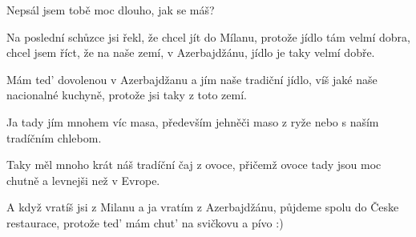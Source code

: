 \documentclass[12pt]{book}
\begin{document}
Nepsál jsem tobě moc dlouho, jak se máš?

Na poslední schůzce jsi řekl, že chcel jít do Mílanu, protože jídlo tám velmí dobra,
chcel jsem říct, že na naše zemí, v Azerbajdžánu, jídlo je taky velmí dobře.

Mám ted' dovolenou v Azerbajdžanu a jím naše tradiční jídlo, víš jaké naše nacionalné
kuchyně, protože jsi taky z toto zemí.

Ja tady jím mnohem víc masa, především jehněči maso z ryže nebo s naším tradíčním chlebom.

Taky měl mnoho krát náš tradíční čaj z ovoce, přičemž ovoce tady jsou moc chutně a levnejši než v Evrope.

A když vratíš jsi z Milanu a ja vratím z Azerbajdžánu, půjdeme spolu do Česke restaurace, protože ted' mám chut' na svičkovu a pívo :)
\end{document}
